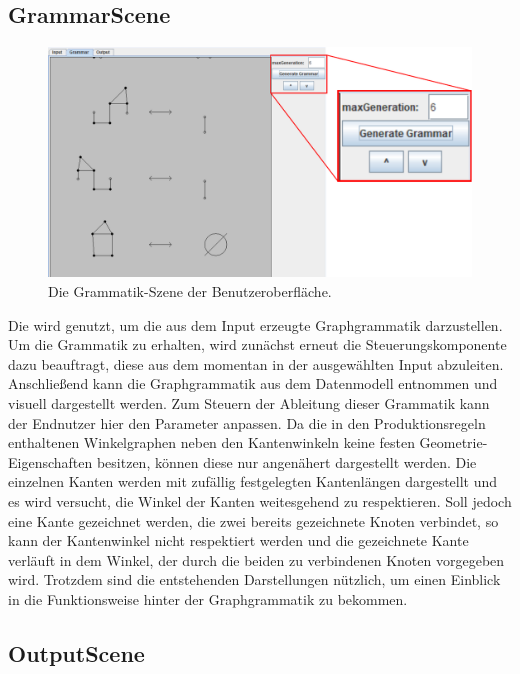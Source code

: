 \subsection{GrammarScene}

\begin{figure}[H]
    \centering
    \includegraphics[width=\textwidth*3/4]{images/grammar_scene.pdf}
    \caption{Die Grammatik-Szene der Benutzeroberfläche.}
    \label{fig:grammar_scene}
\end{figure}

Die  wird genutzt, um die aus dem Input erzeugte Graphgrammatik darzustellen. Um die Grammatik zu erhalten, wird
zunächst erneut die Steuerungskomponente dazu beauftragt, diese aus dem momentan in der  ausgewählten Input abzuleiten.
Anschließend kann die Graphgrammatik aus dem Datenmodell entnommen und visuell dargestellt werden. Zum Steuern der Ableitung dieser
Grammatik kann der Endnutzer hier den Parameter  anpassen. Da die in den
Produktionsregeln enthaltenen Winkelgraphen neben den Kantenwinkeln keine festen Geometrie-Eigenschaften besitzen, können diese nur
angenähert dargestellt werden. Die einzelnen Kanten werden mit zufällig festgelegten Kantenlängen dargestellt und es wird versucht, die
Winkel der Kanten weitesgehend zu respektieren. Soll jedoch eine Kante gezeichnet werden, die zwei bereits gezeichnete Knoten verbindet,
so kann der Kantenwinkel nicht respektiert werden und die gezeichnete Kante verläuft in dem Winkel, der durch die beiden zu verbindenen
Knoten vorgegeben wird. Trotzdem sind die entstehenden Darstellungen nützlich, um einen Einblick in die Funktionsweise hinter der
Graphgrammatik zu bekommen.

\subsection{OutputScene}

